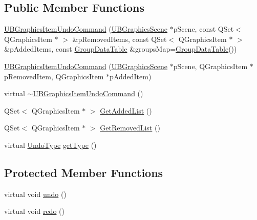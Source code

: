 \subsection*{Public Member Functions}
\begin{DoxyCompactItemize}
\item 
\hyperlink{class_u_b_graphics_item_undo_command_a26b802488d780d6ae3866042813ce87a}{U\-B\-Graphics\-Item\-Undo\-Command} (\hyperlink{class_u_b_graphics_scene}{U\-B\-Graphics\-Scene} $\ast$p\-Scene, const Q\-Set$<$ Q\-Graphics\-Item $\ast$ $>$ \&p\-Removed\-Items, const Q\-Set$<$ Q\-Graphics\-Item $\ast$ $>$ \&p\-Added\-Items, const \hyperlink{class_u_b_graphics_item_undo_command_a4aa053457a498a33bbfef270fbf4608a}{Group\-Data\-Table} \&groups\-Map=\hyperlink{class_u_b_graphics_item_undo_command_a4aa053457a498a33bbfef270fbf4608a}{Group\-Data\-Table}())
\item 
\hyperlink{class_u_b_graphics_item_undo_command_a33921b783afcc94373200089b1d2c414}{U\-B\-Graphics\-Item\-Undo\-Command} (\hyperlink{class_u_b_graphics_scene}{U\-B\-Graphics\-Scene} $\ast$p\-Scene, Q\-Graphics\-Item $\ast$p\-Removed\-Item, Q\-Graphics\-Item $\ast$p\-Added\-Item)
\item 
virtual \hyperlink{class_u_b_graphics_item_undo_command_a14b7dd11561d819a18fc1b81c67a76f4}{$\sim$\-U\-B\-Graphics\-Item\-Undo\-Command} ()
\item 
Q\-Set$<$ Q\-Graphics\-Item $\ast$ $>$ \hyperlink{class_u_b_graphics_item_undo_command_aacd0354963a00b0d0528588e5eefbd78}{Get\-Added\-List} ()
\item 
Q\-Set$<$ Q\-Graphics\-Item $\ast$ $>$ \hyperlink{class_u_b_graphics_item_undo_command_a5d60f1df43ac7f7d785117da9d602ffe}{Get\-Removed\-List} ()
\item 
virtual \hyperlink{class_u_b_abstract_undo_command_a85016029bd4ceb03a8247b3c01e2bd97}{Undo\-Type} \hyperlink{class_u_b_graphics_item_undo_command_aa1bbdd494ad151b48edf59dc1c29d42d}{get\-Type} ()
\end{DoxyCompactItemize}
\subsection*{Protected Member Functions}
\begin{DoxyCompactItemize}
\item 
virtual void \hyperlink{class_u_b_graphics_item_undo_command_ad72c268f481bda2170f4b0cafe193bd5}{undo} ()
\item 
virtual void \hyperlink{class_u_b_graphics_item_undo_command_a85f77fad80b241baaf0c35b98ee7de82}{redo} ()
\end{DoxyCompactItemize}


